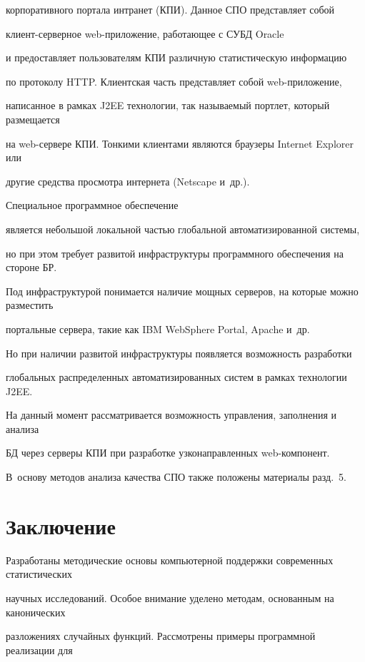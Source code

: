 корпоративного портала интранет (КПИ). Данное СПО представляет собой 


кли\-ент-сер\-вер\-ное web-при\-ло\-же\-ние, работающее с СУБД Oracle 


и предоставляет пользователям КПИ различную статистическую информацию 


по протоколу HTTP. Клиентская часть представляет собой web-при\-ло\-же\-ние, 


написанное в рамках J2EE технологии, так называемый портлет, который размещается 


на web-сер\-ве\-ре КПИ. Тонкими клиентами являются браузеры Internet Explorer или 


другие средства просмотра интернета (Netscape и~др.). 


Специальное программное обеспечение 


является небольшой локальной частью глобальной автоматизированной сис\-те\-мы, 


но при этом требует развитой инфраструктуры программного обеспечения на стороне БР. 


Под инфраструктурой понимается наличие мощных серверов, на которые можно разместить 


портальные сервера, такие как IBM WebSphere Portal, Apache и~др. 


Но при наличии развитой инфраструктуры появляется возможность разработки 


глобальных распределенных автоматизированных систем в рамках технологии J2EE. 


На данный момент рассматривается возможность управления, заполнения и анализа 


БД через серверы КПИ при разработке узконаправленных web-ком\-по\-нент. 


В~основу методов анализа качества СПО также положены материалы разд.~5.





\section{Заключение}





Разработаны методические основы компьютерной поддержки современных статистических 


научных исследований. Особое внимание уделено методам, основанным на канонических 


разложениях случайных функций. Рассмотрены примеры программной реализации для 


